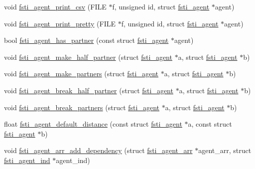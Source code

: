\begin{DoxyCompactItemize}
\item 
void \mbox{\hyperlink{fsti-agent_8c_ad24c55a9a2a07b7a0a07a0fb74be112e}{fsti\+\_\+agent\+\_\+print\+\_\+csv}} (F\+I\+LE $\ast$f, unsigned id, struct \mbox{\hyperlink{structfsti__agent}{fsti\+\_\+agent}} $\ast$agent)
\item 
void \mbox{\hyperlink{fsti-agent_8c_a067437e70d5fe4d1e6f139bab513c6ac}{fsti\+\_\+agent\+\_\+print\+\_\+pretty}} (F\+I\+LE $\ast$f, unsigned id, struct \mbox{\hyperlink{structfsti__agent}{fsti\+\_\+agent}} $\ast$agent)
\item 
bool \mbox{\hyperlink{fsti-agent_8c_ac3681ff2f8616442d578a983ec0c17ea}{fsti\+\_\+agent\+\_\+has\+\_\+partner}} (const struct \mbox{\hyperlink{structfsti__agent}{fsti\+\_\+agent}} $\ast$agent)
\item 
void \mbox{\hyperlink{fsti-agent_8c_afaf3c076c60db61e182fb1e5a8eabc77}{fsti\+\_\+agent\+\_\+make\+\_\+half\+\_\+partner}} (struct \mbox{\hyperlink{structfsti__agent}{fsti\+\_\+agent}} $\ast$a, struct \mbox{\hyperlink{structfsti__agent}{fsti\+\_\+agent}} $\ast$b)
\item 
void \mbox{\hyperlink{fsti-agent_8c_aab565f3b1fa1cb77b6a83efd3faa72e7}{fsti\+\_\+agent\+\_\+make\+\_\+partners}} (struct \mbox{\hyperlink{structfsti__agent}{fsti\+\_\+agent}} $\ast$a, struct \mbox{\hyperlink{structfsti__agent}{fsti\+\_\+agent}} $\ast$b)
\item 
void \mbox{\hyperlink{fsti-agent_8c_a69108c3779a3689185b833a70f589225}{fsti\+\_\+agent\+\_\+break\+\_\+half\+\_\+partner}} (struct \mbox{\hyperlink{structfsti__agent}{fsti\+\_\+agent}} $\ast$a, struct \mbox{\hyperlink{structfsti__agent}{fsti\+\_\+agent}} $\ast$b)
\item 
void \mbox{\hyperlink{fsti-agent_8c_a66a819f51531e6f89f92addab960ae3a}{fsti\+\_\+agent\+\_\+break\+\_\+partners}} (struct \mbox{\hyperlink{structfsti__agent}{fsti\+\_\+agent}} $\ast$a, struct \mbox{\hyperlink{structfsti__agent}{fsti\+\_\+agent}} $\ast$b)
\item 
float \mbox{\hyperlink{fsti-agent_8c_a0624a840237ec82520be71b241220226}{fsti\+\_\+agent\+\_\+default\+\_\+distance}} (const struct \mbox{\hyperlink{structfsti__agent}{fsti\+\_\+agent}} $\ast$a, const struct \mbox{\hyperlink{structfsti__agent}{fsti\+\_\+agent}} $\ast$b)
\item 
void \mbox{\hyperlink{fsti-agent_8c_a63a22afc13737a55174adb97f2cbcfc1}{fsti\+\_\+agent\+\_\+arr\+\_\+add\+\_\+dependency}} (struct \mbox{\hyperlink{structfsti__agent__arr}{fsti\+\_\+agent\+\_\+arr}} $\ast$agent\+\_\+arr, struct \mbox{\hyperlink{structfsti__agent__ind}{fsti\+\_\+agent\+\_\+ind}} $\ast$agent\+\_\+ind)

\end{DoxyCompactItemize}
